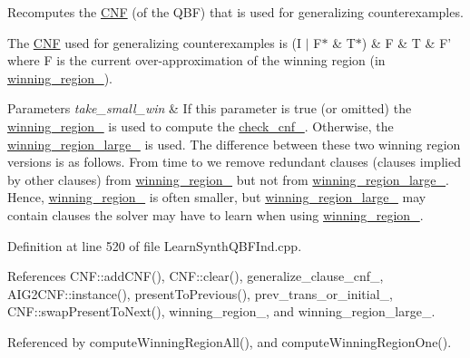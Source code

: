 Recomputes the \hyperlink{classCNF}{C\-N\-F} (of the Q\-B\-F) that is used for generalizing counterexamples. 

The \hyperlink{classCNF}{C\-N\-F} used for generalizing counterexamples is (I $|$ F$\ast$ \& T$\ast$) \& F \& T \& F' where F is the current over-\/approximation of the winning region (in \hyperlink{classLearnSynthQBFInd_ab8ce6031137413e90e0626bbdc734be0}{winning\-\_\-region\-\_\-}).


\begin{DoxyParams}{Parameters}
{\em take\-\_\-small\-\_\-win} & If this parameter is true (or omitted) the \hyperlink{classLearnSynthQBFInd_ab8ce6031137413e90e0626bbdc734be0}{winning\-\_\-region\-\_\-} is used to compute the \hyperlink{classLearnSynthQBFInd_ac90a4574da82c96888db219291368554}{check\-\_\-cnf\-\_\-}. Otherwise, the \hyperlink{classLearnSynthQBFInd_a333c9336ba28a2c41f252a3051a59581}{winning\-\_\-region\-\_\-large\-\_\-} is used. The difference between these two winning region versions is as follows. From time to we remove redundant clauses (clauses implied by other clauses) from \hyperlink{classLearnSynthQBFInd_ab8ce6031137413e90e0626bbdc734be0}{winning\-\_\-region\-\_\-} but not from \hyperlink{classLearnSynthQBFInd_a333c9336ba28a2c41f252a3051a59581}{winning\-\_\-region\-\_\-large\-\_\-}. Hence, \hyperlink{classLearnSynthQBFInd_ab8ce6031137413e90e0626bbdc734be0}{winning\-\_\-region\-\_\-} is often smaller, but \hyperlink{classLearnSynthQBFInd_a333c9336ba28a2c41f252a3051a59581}{winning\-\_\-region\-\_\-large\-\_\-} may contain clauses the solver may have to learn when using \hyperlink{classLearnSynthQBFInd_ab8ce6031137413e90e0626bbdc734be0}{winning\-\_\-region\-\_\-}. \\
\hline
\end{DoxyParams}


Definition at line 520 of file Learn\-Synth\-Q\-B\-F\-Ind.\-cpp.



References C\-N\-F\-::add\-C\-N\-F(), C\-N\-F\-::clear(), generalize\-\_\-clause\-\_\-cnf\-\_\-, A\-I\-G2\-C\-N\-F\-::instance(), present\-To\-Previous(), prev\-\_\-trans\-\_\-or\-\_\-initial\-\_\-, C\-N\-F\-::swap\-Present\-To\-Next(), winning\-\_\-region\-\_\-, and winning\-\_\-region\-\_\-large\-\_\-.



Referenced by compute\-Winning\-Region\-All(), and compute\-Winning\-Region\-One().

